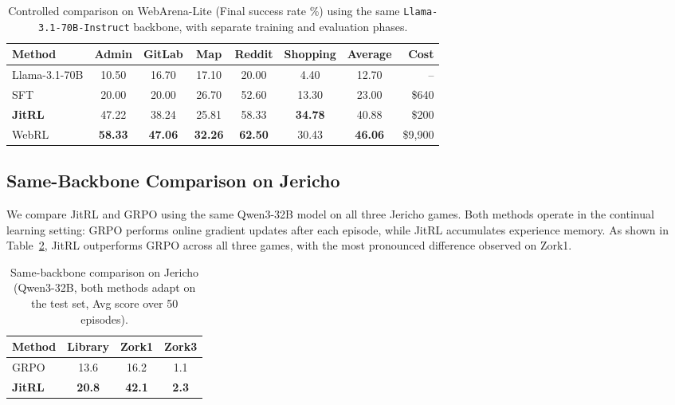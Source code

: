 \begin{table}[h]
\centering
\caption{Controlled comparison on WebArena-Lite (Final success rate \%) using the same \texttt{Llama-3.1-70B-Instruct} backbone, with separate training and evaluation phases.}
\label{tab:large_budget}
\vskip 0.1in
\begin{tabular}{lccccccr}
\toprule
\textbf{Method} & \textbf{Admin} & \textbf{GitLab} & \textbf{Map} & \textbf{Reddit} & \textbf{Shopping} & \textbf{Average} & \textbf{Cost} \\
\midrule
Llama-3.1-70B   & 10.50          & 16.70           & 17.10        & 20.00           & 4.40              & 12.70            & --           \\
SFT             & 20.00          & 20.00           & 26.70        & 52.60           & 13.30             & 23.00            & \$640        \\
\textbf{JitRL}  & 47.22          & 38.24           & 25.81        & 58.33           & \textbf{34.78}    & 40.88            & \$200        \\
WebRL           & \textbf{58.33} & \textbf{47.06}  & \textbf{32.26} & \textbf{62.50} & 30.43             & \textbf{46.06}   & \$9{,}900    \\
\bottomrule
\end{tabular}
\end{table}

\subsection{Same-Backbone Comparison on Jericho}
\label{app:same_backbone_jericho}

We compare JitRL and GRPO using the same Qwen3-32B model on all three Jericho games. Both methods operate in the continual learning setting: GRPO performs online gradient updates after each episode, while JitRL accumulates experience memory. As shown in Table~\ref{tab:jericho_same_backbone}, JitRL outperforms GRPO across all three games, with the most pronounced difference observed on Zork1.

\begin{table}[h]
\centering
\caption{Same-backbone comparison on Jericho (Qwen3-32B, both methods adapt on the test set, Avg score over 50 episodes).}
\label{tab:jericho_same_backbone}
\vskip 0.1in
\begin{tabular}{lccc}
\toprule
\textbf{Method} & \textbf{Library} & \textbf{Zork1} & \textbf{Zork3} \\
\midrule
GRPO           & 13.6             & 16.2           & 1.1            \\
\textbf{JitRL} & \textbf{20.8}    & \textbf{42.1}  & \textbf{2.3}   \\
\bottomrule
\end{tabular}
\end{table}


